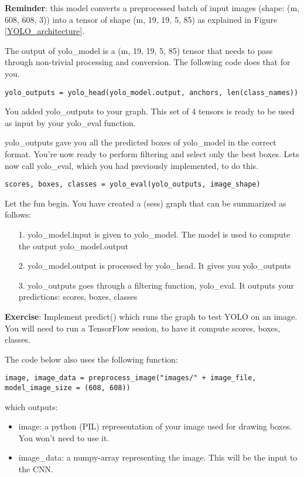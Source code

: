 {\textbf{Reminder}}: this model converts a preprocessed batch of input images (shape: (m, 608, 608, 3)) into a tensor of shape (m, 19, 19, 5, 85) as explained in Figure \ref{YOLO_architecture}.


The output of yolo\_model is a (m, 19, 19, 5, 85) tensor that needs to pass through non-trivial processing and conversion. The following code does that for you.
\begin{verbatim}
yolo_outputs = yolo_head(yolo_model.output, anchors, len(class_names))
\end{verbatim}

You added yolo\_outputs to your graph. This set of 4 tensors is ready to be used as input by your yolo\_eval function.



yolo\_outputs gave you all the predicted boxes of yolo\_model in the correct format. You're now ready to perform filtering and select only the best boxes. Lets now call yolo\_eval, which you had previously implemented, to do this.
\begin{verbatim}
scores, boxes, classes = yolo_eval(yolo_outputs, image_shape)
\end{verbatim}




Let the fun begin. You have created a (sess) graph that can be summarized as follows:
\begin{itemize}
\item[1.] yolo\_model.input is given to yolo\_model. The model is used to compute the output yolo\_model.output
\item[2.] yolo\_model.output is processed by yolo\_head. It gives you yolo\_outputs
\item[3.] yolo\_outputs goes through a filtering function, yolo\_eval. It outputs your predictions: scores, boxes, classes
\end{itemize}

{\textbf{Exercise}}: Implement predict() which runs the graph to test YOLO on an image. You will need to run a TensorFlow session, to have it compute scores, boxes, classes.

The code below also uses the following function:
\begin{verbatim}
image, image_data = preprocess_image("images/" + image_file, model_image_size = (608, 608))
\end{verbatim}
which outputs:
\begin{itemize}
\item image: a python (PIL) representation of your image used for drawing boxes. You won't need to use it.
\item image\_data: a numpy-array representing the image. This will be the input to the CNN.
\end{itemize}

